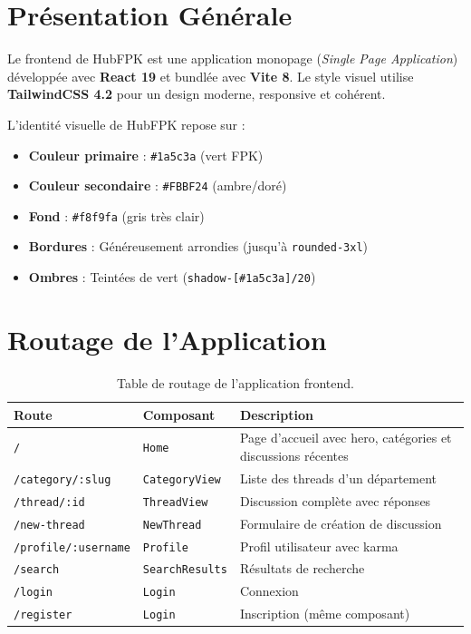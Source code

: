\documentclass[12pt, a4paper]{report}
\begin{document}
\section{Présentation Générale}

Le frontend de HubFPK est une application monopage (\textit{Single Page Application}) développée avec \textbf{React 19} et bundlée avec \textbf{Vite 8}. Le style visuel utilise \textbf{TailwindCSS 4.2} pour un design moderne, responsive et cohérent.

L'identité visuelle de HubFPK repose sur :
\begin{itemize}
    \item \textbf{Couleur primaire} : \texttt{\#1a5c3a} (vert FPK)
    \item \textbf{Couleur secondaire} : \texttt{\#FBBF24} (ambre/doré)
    \item \textbf{Fond} : \texttt{\#f8f9fa} (gris très clair)
    \item \textbf{Bordures} : Généreusement arrondies (jusqu'à \texttt{rounded-3xl})
    \item \textbf{Ombres} : Teintées de vert (\texttt{shadow-[{\#}1a5c3a]/20})
\end{itemize}

\section{Routage de l'Application}

\begin{table}[H]
\centering
\renewcommand{\arraystretch}{1.3}
\begin{tabularx}{\textwidth}{l l X}
\toprule
\textbf{Route} & \textbf{Composant} & \textbf{Description} \\
\midrule
\texttt{/} & \texttt{Home} & Page d'accueil avec hero, catégories et discussions récentes \\
\texttt{/category/:slug} & \texttt{CategoryView} & Liste des threads d'un département \\
\texttt{/thread/:id} & \texttt{ThreadView} & Discussion complète avec réponses \\
\texttt{/new-thread} & \texttt{NewThread} & Formulaire de création de discussion \\
\texttt{/profile/:username} & \texttt{Profile} & Profil utilisateur avec karma \\
\texttt{/search} & \texttt{SearchResults} & Résultats de recherche \\
\texttt{/login} & \texttt{Login} & Connexion \\
\texttt{/register} & \texttt{Login} & Inscription (même composant) \\
\bottomrule
\end{tabularx}
\caption{Table de routage de l'application frontend.}
\end{table}
\end{document}
